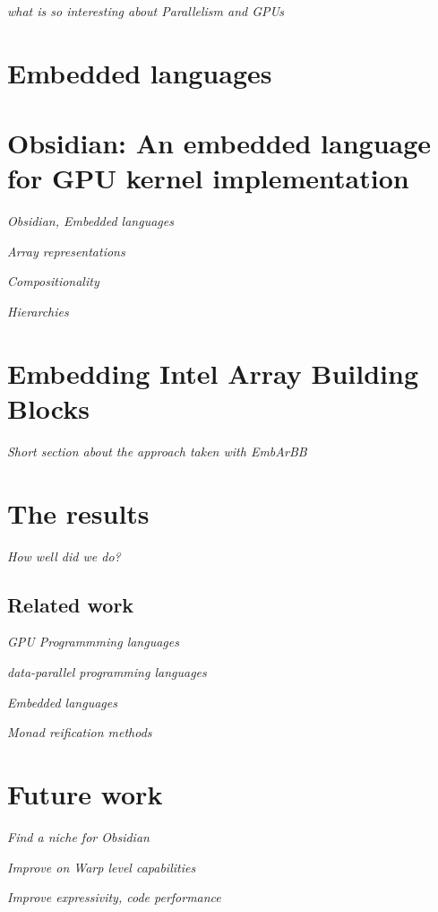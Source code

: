 \documentclass[a4paper]{book}
\begin{document}
\emph{what is so interesting about Parallelism and GPUs}

\section{Embedded languages}


\section{Obsidian: An embedded language for GPU kernel implementation}

\noindent\emph{Obsidian, Embedded languages} 

\noindent\emph{Array representations} 

\noindent\emph{Compositionality} 

\noindent\emph{Hierarchies} 

\section{Embedding Intel Array Building Blocks} 

\noindent\emph{Short section about the approach taken with EmbArBB}

\section{The results} 

\emph{ How well did we do?} 

\subsection{Related work} 

\noindent\emph{GPU Programmming languages}

\noindent\emph{data-parallel programming languages} 

\noindent\emph{Embedded languages} 

\noindent\emph{Monad reification methods} 

\section{Future work} 

\noindent\emph{Find a niche for Obsidian} 

\noindent\emph{Improve on Warp level capabilities} 

\noindent\emph{Improve expressivity, code performance} 
\end{document}
